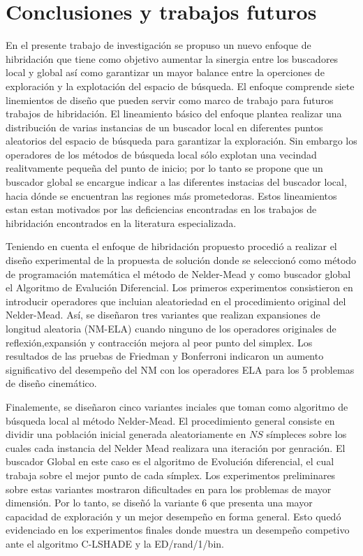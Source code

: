 \chapter{Conclusiones y trabajos futuros} \label{Chapter8}
En el presente trabajo de investigación se propuso un nuevo enfoque de hibridación que tiene como objetivo aumentar la sinergia entre los buscadores local y global así como garantizar un mayor balance entre la operciones de exploración y la explotación del espacio de búsqueda. El enfoque comprende siete linemientos de diseño que pueden servir como marco de trabajo para futuros trabajos de hibridación. El lineamiento básico del enfoque plantea realizar una distribución de varias instancias de un buscador local en diferentes puntos aleatorios del espacio de búsqueda para garantizar la exploración. Sin embargo los operadores de los métodos de búsqueda local sólo explotan una vecindad realitvamente pequeña del punto de inicio; por lo tanto se propone que un buscador global se encargue indicar  a las diferentes instacias del buscador local, hacia dónde se encuentran las regiones más prometedoras. Estos lineamientos estan estan motivados por las deficiencias encontradas en los trabajos de hibridación encontrados en la literatura especializada.

Teniendo en cuenta el enfoque de hibridación propuesto procedió a realizar el diseño experimental de la propuesta de solución donde se seleccionó como método de programación matemática el método de Nelder-Mead y como buscador global el Algoritmo de Evalución Diferencial. Los primeros experimentos consistieron en introducir operadores que incluian aleatoriedad en el procedimiento original del Nelder-Mead. Así, se diseñaron tres variantes que realizan expansiones de longitud aleatoria (NM-ELA) cuando ninguno de los operadores originales de reflexión,expansión y contracción mejora al peor punto del simplex. Los resultados de las pruebas de Friedman y Bonferroni indicaron un aumento significativo del desempeño del NM con los operadores ELA para los 5 problemas de diseño cinemático. 

Finalemente, se diseñaron cinco variantes inciales que toman como algoritmo de búsqueda local al método Nelder-Mead. El procedimiento general consiste en dividir una población inicial generada aleatoriamente en $NS$ símpleces sobre los cuales cada instancia del Nelder Mead realizara una iteración por genración. El buscador Global en este caso es el algoritmo de Evolución diferencial, el cual trabaja sobre el mejor punto de cada símplex. Los experimentos preliminares sobre estas variantes mostraron dificultades en para los problemas de mayor dimensión. Por lo tanto, se diseñó la variante 6 que presenta una mayor capacidad de exploración y un mejor desempeño en forma general. Esto quedó evidenciado en los experimentos finales donde muestra un desempeño competivo ante el algoritmo C-LSHADE y la ED/rand/1/bin.

